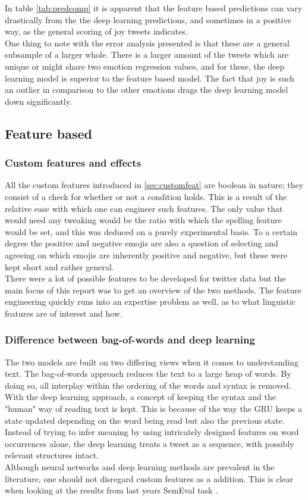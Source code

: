 In table \ref{tab:predcomp} it is apparent that the feature based predictions can vary drastically from the the deep learning predictions, and sometimes in a positive way, as the general scoring of joy tweets indicates.\\
One thing to note with the error analysis presented is that these are a general subsample of a larger whole. There is a larger amount of the tweets which are unique or might share two emotion regression values, and for these, the deep learning model is superior to the feature based model. The fact that joy is such an outlier in comparison to the other emotions drags the deep learning model down significantly.   

\subsection{Feature based}
\subsubsection{Custom features and effects}
All the custom features introduced in \ref{sec:customfeat} are boolean in nature; they consist of a check for whether or not a condition holds. This is a result of the relative ease with which one can engineer such features. The only value that would need any tweaking would be the ratio with which the spelling feature would be set, and this was deduced on a purely experimental basis. To a certain degree the positive and negative emojis are also a question of selecting and agreeing on which emojis are inherently positive and negative, but these were kept short and rather general.\\
There were a lot of possible features to be developed for twitter data but the main focus of this report was to get an overview of the two methods. The feature engineering quickly runs into an expertise problem as well, as to what linguistic features are of interest and how.

\subsubsection{Difference between bag-of-words and deep learning}
The two models are built on two differing views when it comes to understanding text. The bag-of-words approach reduces the text to a large heap of words. By doing so, all interplay within the ordering of the words and syntax is removed. With the deep learning approach, a concept of keeping the syntax and the "human" way of reading text is kept. This is because of the way the GRU keeps a state updated depending on the word being read but also the previous state. Instead of trying to infer meaning by using intricately designed features on word occurrences alone, the deep learning treats a tweet as a sequence, with possibly relevant structures intact. \\
Although neural networks and deep learning methods are prevalent in the literature, one should not disregard custom features as a addition. This is clear when looking at the results from last years SemEval task \cite{wassa2017}.

